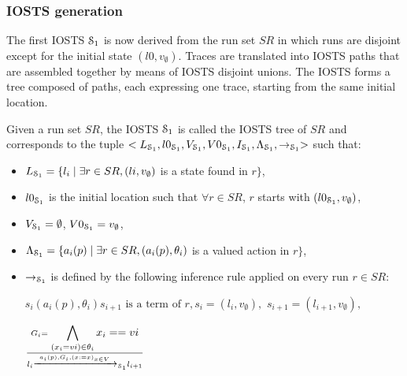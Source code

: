 
\subsubsection{IOSTS generation}
\label{sec:iosts-gen}

The first IOSTS $\EuScript{S}_1$ is now derived from the run set
$SR$ in which runs are disjoint except for the initial state
$(l0,v_\emptyset)$. Traces are translated into IOSTS paths that
are assembled together by means of IOSTS disjoint unions. The
IOSTS forms a tree composed of paths, each expressing one trace,
starting from the same initial location.

\begin{definition}
\label{IOSTS_tree}
Given a run set $SR$, the IOSTS $\EuScript{S}_1$ is called the
IOSTS tree of $SR$ and corresponds to the tuple
$<L_{\EuScript{S}_1}, l0_{\EuScript{S}_1},V_{\EuScript{S}_1},
V0_{\EuScript{S}_1}, I_{\EuScript{S}_1},
\Lambda_{\EuScript{S}_1},\rightarrow_{\EuScript{S}_1}>$ such
that:

\begin{itemize}

\item $L_{\EuScript{S}_1}= \{l_i \mid \exists r\in SR, (li,v_\emptyset)$ is
a state found in $r\}$,

\item $l0_{\EuScript{S}_1}$ is the initial location such that $\forall r \in
SR$, $r$ starts with $(l0_{\EuScript{S}_1},v_\emptyset)$,

\item $V_{\EuScript{S}_1}=\emptyset$, $V0_{\EuScript{S}_1}=v_\emptyset$,

\item $\Lambda_{\EuScript{S}_1}= \{a_i(p) \mid \exists r\in SR,
(a_i(p),\theta_i)$ is a valued action in $r\}$,

\item $\rightarrow_{\EuScript{S}_1}$ is defined by the following
    inference rule applied on every run $r\in SR$:

    $s_i (a_i(p),\theta_i) s_{i+1} \text{ is a term of } r,
    s_i=(l_i,v_\emptyset),$ $s_{i+1}=(l_{i+1},v_\emptyset),$

    \begin{center}
        $\frac{G_i=\displaystyle \bigwedge_{(x_i=vi)\in \theta_i} x_i==vi}
        {l_i \xrightarrow{a_i(p),G_i,(x:=x)_{x\in V}}_{\EuScript{S}_1} l_{i+1}}$
    \end{center}

\end{itemize}
\end{definition}

